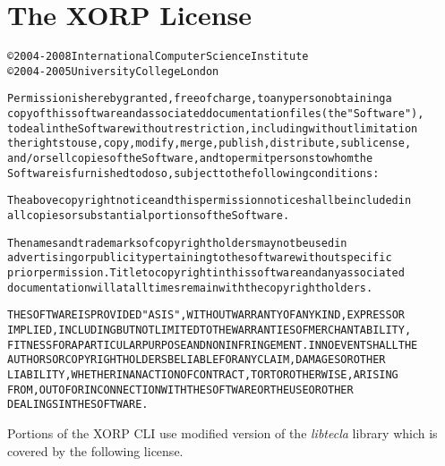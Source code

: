 \section*{The XORP License}
\vspace{-0.3in}
\begin{alltt}
\small\noindent
\copyright 2004-2008 International Computer Science Institute
\copyright 2004-2005 University College London

Permission is hereby granted, free of charge, to any person obtaining a
copy of this software and associated documentation files (the "Software"),
to deal in the Software without restriction, including without limitation
the rights to use, copy, modify, merge, publish, distribute, sublicense,
and/or sell copies of the Software, and to permit persons to whom the
Software is furnished to do so, subject to the following conditions:

The above copyright notice and this permission notice shall be included in
all copies or substantial portions of the Software.

The names and trademarks of copyright holders may not be used in
advertising or publicity pertaining to the software without specific
prior permission. Title to copyright in this software and any associated
documentation will at all times remain with the copyright holders.

THE SOFTWARE IS PROVIDED "AS IS", WITHOUT WARRANTY OF ANY KIND, EXPRESS OR
IMPLIED, INCLUDING BUT NOT LIMITED TO THE WARRANTIES OF MERCHANTABILITY,
FITNESS FOR A PARTICULAR PURPOSE AND NONINFRINGEMENT. IN NO EVENT SHALL THE
AUTHORS OR COPYRIGHT HOLDERS BE LIABLE FOR ANY CLAIM, DAMAGES OR OTHER
LIABILITY, WHETHER IN AN ACTION OF CONTRACT, TORT OR OTHERWISE, ARISING
FROM, OUT OF OR IN CONNECTION WITH THE SOFTWARE OR THE USE OR OTHER
DEALINGS IN THE SOFTWARE.
\end{alltt}

Portions of the XORP CLI use modified version of the {\it libtecla}
library which is covered by the following license.

